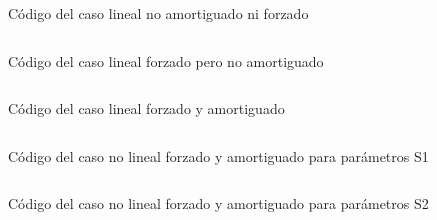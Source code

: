 \documentclass[11pt]{article}
\begin{document}
\begin{figure}
\inputminted{python}{../caso_forzado.py}
\caption{Código del caso lineal no amortiguado ni forzado}
\end{figure}

\begin{figure}
\inputminted{python}{../caso_forzado.py}
\caption{Código del caso lineal forzado pero no amortiguado}
\end{figure}

\begin{figure}
\inputminted{python}{../caso_forzado_amortiguado.py}
\caption{Código del caso lineal forzado y amortiguado}
\end{figure}

\begin{figure}
\inputminted{python}{../caso_anarmonico_forzado_amortiguado_s1.py}
\caption{Código del caso no lineal forzado y amortiguado para parámetros S1}
\end{figure}

\begin{figure}
\inputminted{python}{../caso_anarmonico_forzado_amortiguado_s2.py}
\caption{Código del caso no lineal forzado y amortiguado para parámetros S2}
\end{figure}
\end{document}
